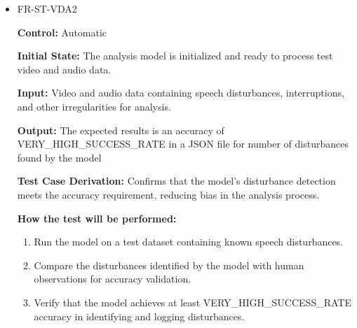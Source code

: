 \documentclass[12pt, titlepage]{article}
\begin{document}
\begin{itemize}
  \item FR-ST-VDA2
  \begin{mdframed}[linewidth=0.5mm]
      \textbf{Control:} Automatic \par
      \textbf{Initial State:} The analysis model is initialized and ready to process test video and audio data. \par
      \textbf{Input:} Video and audio data containing speech disturbances, interruptions, and other irregularities for analysis. \par
      \textbf{Output:} The expected results is an accuracy of VERY\_HIGH\_SUCCESS\_RATE in a JSON file for number of disturbances found by the model \par
      \textbf{Test Case Derivation:} Confirms that the model’s disturbance detection meets the accuracy requirement, reducing bias in the analysis process. \par
      \textbf{How the test will be performed:}
      \begin{enumerate}[noitemsep]
        \item Run the model on a test dataset containing known speech disturbances.
        \item Compare the disturbances identified by the model with human observations for accuracy validation.
        \item Verify that the model achieves at least VERY\_HIGH\_SUCCESS\_RATE \\ accuracy in identifying and logging disturbances.
      \end{enumerate}
  \end{mdframed}


\end{itemize}
\end{document}
